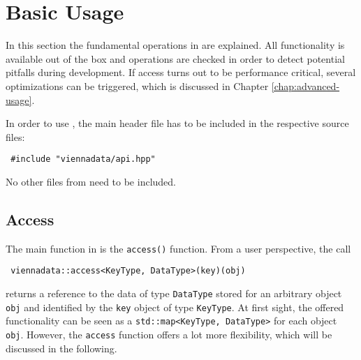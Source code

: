 \chapter{Basic Usage} \label{chap:basic-usage}

In this section the fundamental operations in {\ViennaData} are explained. 
All functionality is available out of the box and operations are checked in order to detect potential pitfalls during development.
If {\ViennaData} access turns out to be 
performance critical, several optimizations can be triggered, which is discussed in Chapter \ref{chap:advanced-usage}.

In order to use {\ViennaData}, the main header file has to be included in the respective source files:
\begin{lstlisting}
 #include "viennadata/api.hpp"
\end{lstlisting}
No other files from {\ViennaData} need to be included.

\section{Access} \label{sec:access}
The main function in {\ViennaData} is the \lstinline|access()| function. From a user perspective,
the call
\begin{lstlisting}
 viennadata::access<KeyType, DataType>(key)(obj) 
\end{lstlisting}
returns a reference to the data of type \lstinline|DataType| stored for an arbitrary object \lstinline|obj| and identified by the \lstinline|key| object of
type \lstinline|KeyType|. At first sight, the offered functionality can be seen as a \lstinline|std::map<KeyType, DataType>| for each object \lstinline|obj|.
However, the \lstinline|access| function offers a lot more flexibility, which will be discussed in the following.

